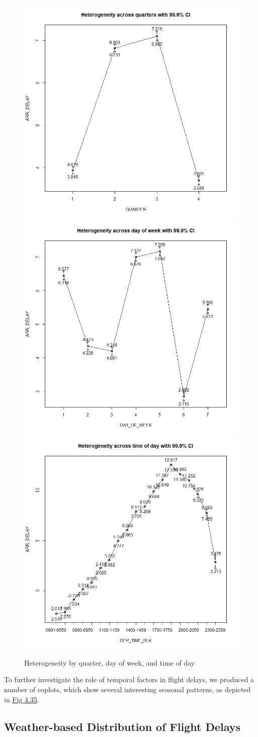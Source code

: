 \documentclass[12pt, a4paper, openany]{book}
\begin{document}
		\begin{figure}
		\centering
		\includegraphics[width = .33 \textwidth]{../figures/heterogeneity_quarters}\includegraphics[width = .33 \textwidth]{../figures/heterogeneity_dayofweek}\\ \includegraphics[width = .33 \textwidth]{../figures/heterogeneity_timeofday}
		\caption{Heterogeneity by quarter, day of week, and time of day}
		\end{figure}
	To further investigate the role of temporal factors in flight delays, we produced a number of coplots, which show several interesting seasonal patterns, as depicted in \underline{Fig 4.35}.\\	 		
		\subsection{Weather-based Distribution of Flight Delays}
		
\end{document}
